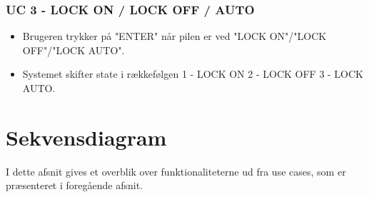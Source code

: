 \subsubsection{UC 3 - LOCK ON / LOCK OFF / AUTO}

\begin{itemize}
	\item Brugeren trykker på "ENTER" når pilen er ved "LOCK ON"/"LOCK OFF"/"LOCK AUTO".
	\item Systemet skifter state i rækkefølgen 1 - LOCK ON 2 - LOCK OFF 3 - LOCK AUTO.
\end{itemize}

\newpage
\section{Sekvensdiagram}
I dette afsnit gives et overblik over funktionaliteterne ud fra use cases, som er præsenteret i foregående afsnit. 

